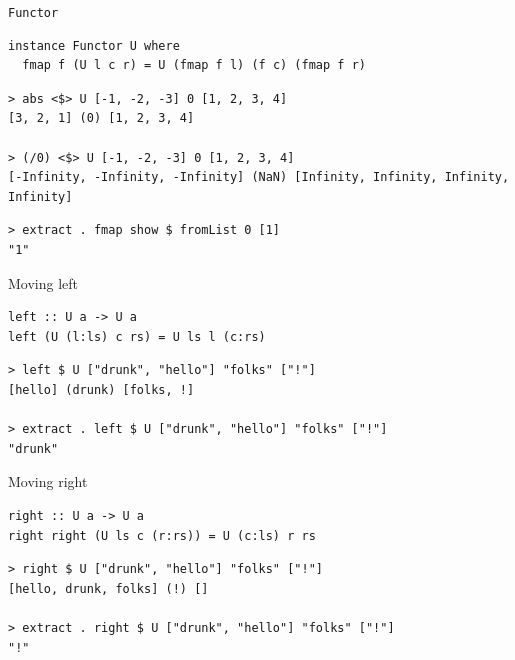 \documentclass[presentation,aspectratio=169,smaller]{beamer}
\begin{document}
\begin{frame}[label={sec:org2b4b05e},fragile]{\texttt{Functor}}
 \begin{verbatim}
instance Functor U where
  fmap f (U l c r) = U (fmap f l) (f c) (fmap f r)
\end{verbatim}

\pause

\begin{verbatim}
> abs <$> U [-1, -2, -3] 0 [1, 2, 3, 4]
[3, 2, 1] (0) [1, 2, 3, 4]

> (/0) <$> U [-1, -2, -3] 0 [1, 2, 3, 4]
[-Infinity, -Infinity, -Infinity] (NaN) [Infinity, Infinity, Infinity, Infinity]
\end{verbatim}

\pause

\begin{verbatim}
> extract . fmap show $ fromList 0 [1]
"1"
\end{verbatim}
\end{frame}

\begin{frame}[label={sec:orgb76db2a},fragile]{Moving left}
 \begin{verbatim}
left :: U a -> U a
left (U (l:ls) c rs) = U ls l (c:rs)
\end{verbatim}

\pause

\begin{verbatim}
> left $ U ["drunk", "hello"] "folks" ["!"]
[hello] (drunk) [folks, !]

> extract . left $ U ["drunk", "hello"] "folks" ["!"]
"drunk"
\end{verbatim}
\end{frame}

\begin{frame}[label={sec:orge92e475},fragile]{Moving right}
 \begin{verbatim}
right :: U a -> U a
right right (U ls c (r:rs)) = U (c:ls) r rs
\end{verbatim}

\pause

\begin{verbatim}
> right $ U ["drunk", "hello"] "folks" ["!"]
[hello, drunk, folks] (!) []

> extract . right $ U ["drunk", "hello"] "folks" ["!"]
"!"
\end{verbatim}
\end{frame}
\end{document}
